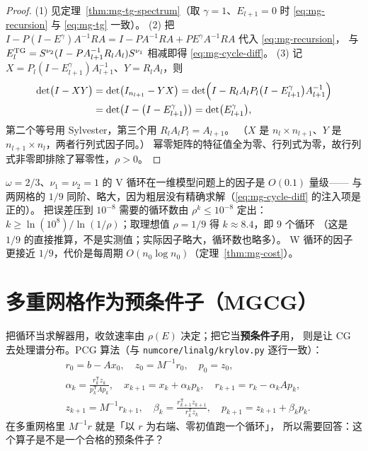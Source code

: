 \begin{proof}
(1) 见定理~\ref{thm:mg-tg-spectrum}（取 $\gamma=1$、$E_{l+1}=0$ 时
\eqref{eq:mg-recursion} 与 \eqref{eq:mg-tg} 一致）。
(2) 把 $I-P(I-E^{\gamma})A^{-1}RA=I-PA^{-1}RA+PE^{\gamma}A^{-1}RA$ 代入 \eqref{eq:mg-recursion}，
与 $E_l^{\rm TG}=S^{\nu_2}(I-PA_{l+1}^{-1}R_lA_l)S^{\nu_1}$ 相减即得 \eqref{eq:mg-cycle-diff}。
(3) 记 $X=P_l(I-E_{l+1}^{\gamma})A_{l+1}^{-1}$、$Y=R_lA_l$，则
\begin{equation}
  \begin{aligned}
    \det\bigl(I-XY\bigr)&=\det\bigl(I_{n_{l+1}}-YX\bigr)
    =\det\Bigl(I-R_lA_lP_l\bigl(I-E_{l+1}^{\gamma}\bigr)A_{l+1}^{-1}\Bigr)\\
    &=\det\bigl(I-\bigl(I-E_{l+1}^{\gamma}\bigr)\bigr)=\det\bigl(E_{l+1}^{\gamma}\bigr),
  \end{aligned}
\end{equation}
第二个等号用 Sylvester，第三个用 $R_lA_lP_l=A_{l+1}$。
（$X$ 是 $n_l\times n_{l+1}$、$Y$ 是 $n_{l+1}\times n_l$，两者行列式因子同。）
幂零矩阵的特征值全为零、行列式为零，故行列式非零即排除了幂零性，$\rho>0$。
\end{proof}

\begin{remark}[应该期待什么]
$\omega=2/3$、$\nu_1=\nu_2=1$ 的 V 循环在一维模型问题上的因子是 $O(0.1)$ 量级——
与两网格的 $1/9$ 同阶、略大，因为粗层没有精确求解（\eqref{eq:mg-cycle-diff} 的注入项是正的）。
把误差压到 $10^{-8}$ 需要的循环数由 $\rho^k\le10^{-8}$ 定出：
$k\ge \ln(10^{8})/\ln(1/\rho)$；取理想值 $\rho=1/9$ 得 $k\approx8.4$，即 $9$ 个循环
（这是 $1/9$ 的直接推算，不是实测值；实际因子略大，循环数也略多）。
W 循环的因子更接近 $1/9$，代价是每周期 $O(n_0\log n_0)$（定理~\ref{thm:mg-cost}）。
\end{remark}

\section{多重网格作为预条件子（MGCG）}
\label{sec:mg-mgcg}

把循环当求解器用，收敛速率由 $\rho(E)$ 决定；把它当\textbf{预条件子}用，
则是让 CG 去处理谱分布。PCG 算法（与 \texttt{numcore/linalg/krylov.py} 逐行一致）：
\begin{equation}
  \begin{aligned}
    &r_0=b-Ax_0,\quad z_0=M^{-1}r_0,\quad p_0=z_0,\\
    &\alpha_k=\frac{r_k^{\mathsf T}z_k}{p_k^{\mathsf T}Ap_k},\quad
    x_{k+1}=x_k+\alpha_kp_k,\quad
    r_{k+1}=r_k-\alpha_kAp_k,\\
    &z_{k+1}=M^{-1}r_{k+1},\quad
    \beta_k=\frac{r_{k+1}^{\mathsf T}z_{k+1}}{r_k^{\mathsf T}z_k},\quad
    p_{k+1}=z_{k+1}+\beta_kp_k .
  \end{aligned}
  \label{eq:mg-pcg}
\end{equation}
在多重网格里 $M^{-1}r$ 就是「以 $r$ 为右端、零初值跑一个循环」，
所以需要回答：这个算子是不是一个合格的预条件子？

